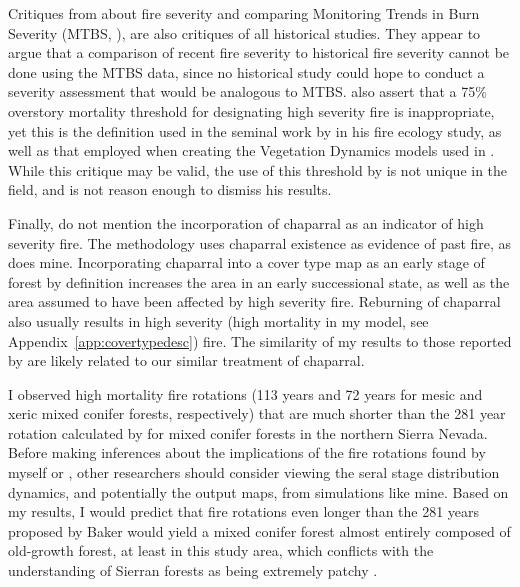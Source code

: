 Critiques from \citet{Fule2014} about fire severity and comparing Monitoring Trends in Burn Severity (MTBS, ), are also critiques of all historical studies. They appear to argue that a comparison of recent fire severity to historical fire severity cannot be done using the MTBS data, since no historical study could hope to conduct a severity assessment that would be analogous to MTBS. \citet{Fule2014} also assert that a 75\% overstory mortality threshold for designating high severity fire is inappropriate, yet this is the definition used in the seminal work by \citet{Agee1993} in his fire ecology study, as well as that employed when creating the Vegetation Dynamics models used in \citet{Landfire2007}. While this critique may be valid, the use of this threshold by \citet{Baker2014} is not unique in the field, and is not reason enough to dismiss his results. 

Finally, \citet{Fule2014} do not mention the incorporation of chaparral as an indicator of high severity fire. The \citep{Baker2014} methodology uses chaparral existence as evidence of past fire, as does mine. Incorporating chaparral into a cover type map as an early stage of forest by definition increases the area in an early successional state, as well as the area assumed to have been affected by high severity fire. Reburning of chaparral also usually results in high severity (high mortality in my model, see Appendix~\ref{app:covertypedesc}) fire. The similarity of my results to those reported by \citet{Baker2014} are likely related to our similar treatment of chaparral.

I observed high mortality fire rotations (113 years and 72 years for mesic and xeric mixed conifer forests, respectively) that are much shorter than the 281 year rotation calculated by \citet{Baker2014} for mixed conifer forests in the northern Sierra Nevada. Before making inferences about the implications of the fire rotations found by myself or \citet{Baker2014}, other researchers should consider viewing the seral stage distribution dynamics, and potentially the output maps, from simulations like mine. Based on my results, I would predict that fire rotations even longer than the 281 years proposed by Baker would yield a mixed conifer forest almost entirely composed of old-growth forest, at least in this study area, which conflicts with the understanding of Sierran forests as being extremely patchy \citep{Franklin1996,SNEP1996}. 

